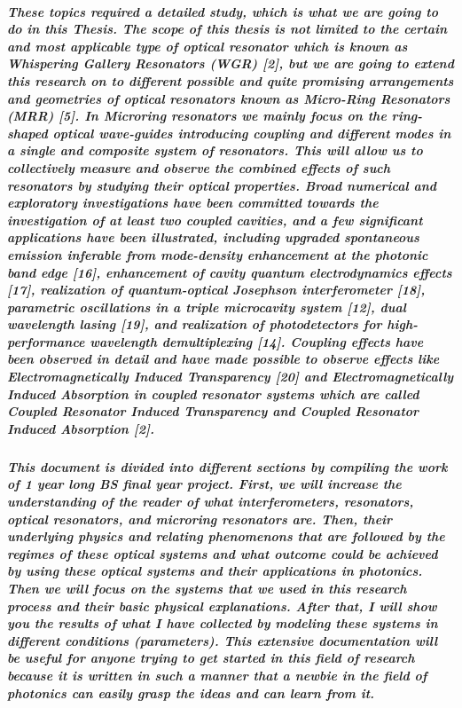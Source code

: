 \subparagraph{\normalfont \large These topics required a detailed study, which is what we are going to do in this Thesis. The scope of this thesis is not limited to the certain and most applicable type of optical resonator which is known as Whispering Gallery Resonators (WGR) [2], but we are going to extend this research on to different possible and quite promising arrangements and geometries of optical resonators known as Micro-Ring Resonators (MRR) [5]. In Microring resonators we mainly focus on the ring-shaped optical wave-guides introducing coupling and different modes in a single and composite system of resonators. This will allow us to collectively measure and observe the combined effects of such resonators by studying their optical properties. Broad numerical and exploratory investigations have been committed towards the investigation of at least two coupled cavities, and a few significant applications have been illustrated, including upgraded spontaneous emission inferable from mode-density enhancement at the photonic band edge [16], enhancement of cavity quantum electrodynamics effects [17], realization of
quantum-optical Josephson interferometer [18], parametric oscillations in a triple microcavity
system [12], dual wavelength lasing [19], and realization of photodetectors for high-performance wavelength demultiplexing [14]. Coupling effects have been observed in detail and have made possible to observe effects like Electromagnetically Induced Transparency [20] and Electromagnetically Induced Absorption in coupled resonator systems which are called Coupled Resonator Induced Transparency and Coupled Resonator Induced Absorption [2].}
\subparagraph{\normalfont \large This document is divided into different sections by compiling the work of 1 year long BS final year project. First, we will increase the understanding of the reader of what interferometers, resonators, optical resonators, and microring resonators are. Then, their underlying physics and relating phenomenons that are followed by the regimes of these optical systems and what outcome could be achieved by using these optical systems and their applications in photonics. Then we will focus on the systems that we used in this research process and their basic physical explanations. After that, I will show you the results of what I have collected by modeling these systems in different conditions (parameters). This extensive documentation will be useful for anyone trying to get started in this field of research because it is written in such a manner that a newbie in the field of photonics can easily grasp the ideas and can learn from it. }

